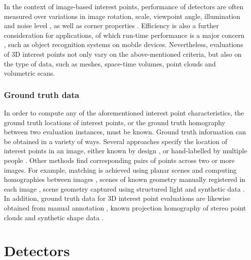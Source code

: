 In the context of image-based interest points, performance of detectors are often measured over variations in image rotation, scale, viewpoint angle, illumination and noise level \cite{Schmid2000}, as well as corner properties \cite{Rajan1989}. Efficiency is also a further consideration for applications, of which run-time performance is a major concern \cite{Rosten2010}, such as object recognition systems on mobile devices. Nevertheless, evaluations of 3D interest points not only vary on the above-mentioned criteria, but also on the type of data, such as meshes, space-time volumes, point clouds and volumetric scans.


\subsubsection{Ground truth data} 

In order to compute any of the aforementioned interest point characteristics, the ground truth locations of interest points, or the ground truth homography between two evaluation instances, must be known. Ground truth information can be obtained in a variety of ways.  
Several approaches specify the location of interest points in an image, either known by design \cite{Rajan1989}, or hand-labelled by multiple people \cite{Heath1997}. 
Other methods find corresponding pairs of points across two or more images. For example, matching is achieved using planar scenes and computing homographies between images \cite{Schmid2000}, scenes of known geometry manually registered in each image \cite{Rosten2010}, scene geometry captured using structured light \cite{Aanaes2012} and synthetic data \cite{Laptev2005}. 
In addition, ground truth data for 3D interest point evaluations are likewise obtained from manual annotation \cite{Dutagaci2011}, known projection homography of stereo point clouds \cite{Aanaes2012} and synthetic shape data \cite{Salti2011}. 

\section{Detectors}
\label{sec/eval/detectors}

